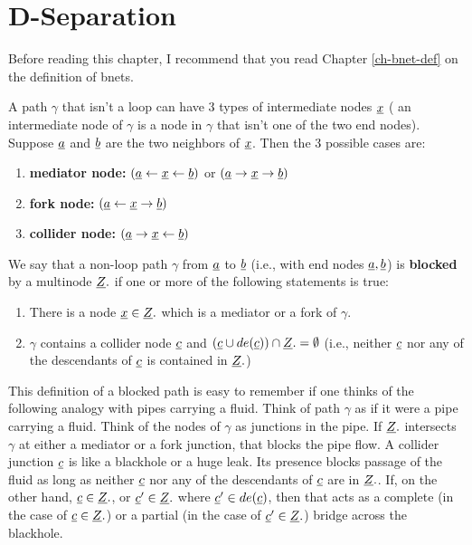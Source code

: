 \chapter{D-Separation}
\label{ch-dsep}
Before reading this chapter,
I  recommend
that you
read
Chapter \ref{ch-bnet-def}
on the definition of bnets.


A path $\gamma$ that
isn't a loop can have 
3 types of intermediate nodes ${\underline{x}}$ (
an intermediate node of $\gamma$
 is a node in $\gamma$ that 
isn't one
of the two end nodes).
Suppose ${\underline{a}}$ and ${\underline{b}}$
are the two neighbors of ${\underline{x}}$. Then
the 3 possible cases are:
\begin{enumerate}
\item {\bf mediator node:}
$({\underline{a}}\leftarrow{\underline{x}}\leftarrow {\underline{b}})$
or
$({\underline{a}}\rightarrow{\underline{x}}\rightarrow {\underline{b}})$
\item {\bf fork node:}
$({\underline{a}}\leftarrow{\underline{x}}\rightarrow {\underline{b}})$
\item {\bf collider node:}
$({\underline{a}}\rightarrow{\underline{x}}\leftarrow {\underline{b}})$
\end{enumerate}

We say that a non-loop path 
$\gamma$ 
from ${\underline{a}}$ to ${\underline{b}}$ (i.e., with
end nodes ${\underline{a}}, {\underline{b}}$)
is {\bf blocked} 
by a multinode ${\underline{Z}}.$
if one or more 
of the following
statements is true:

\begin{enumerate}
\item 
There is a node ${\underline{x}}\in {\underline{Z}}.$
which is a mediator 
or a fork of $\gamma$.
\item
$\gamma$ contains a collider
node ${\underline{c}}$
and 
$({\underline{c}}\cup de({\underline{c}}))\cap{\underline{Z}}.=\emptyset$
(i.e., neither 
${\underline{c}}$ nor 
any of the descendants of ${\underline{c}}$
is contained in ${\underline{Z}}.$)
\end{enumerate}

This definition of a blocked 
path is easy to remember
if one thinks 
of the following analogy
with pipes carrying a fluid.
Think of path
$\gamma$ as if it
were a pipe
carrying a fluid.
Think of
the nodes 
of $\gamma$ as junctions in the pipe.
If ${\underline{Z}}.$
intersects $\gamma$
at either a mediator
or a fork junction,
that blocks the pipe flow.
A collider junction ${\underline{c}}$
is like a blackhole 
or a huge leak.
Its presence
blocks passage
of the fluid
as long
as neither
${\underline{c}}$
nor any of
the descendants 
of ${\underline{c}}$
are in ${\underline{Z}}.$.
If,
on the 
other hand,
${\underline{c}}\in{\underline{Z}}.$,
or ${\underline{c}}'\in {\underline{Z}}.$
where ${\underline{c}}'\in de({\underline{c}})$,
then
that acts
as a complete
(in the case of ${\underline{c}}\in{\underline{Z}}.$)
or a partial 
(in the case of ${\underline{c}}'\in{\underline{Z}}.$)
bridge across the blackhole.

